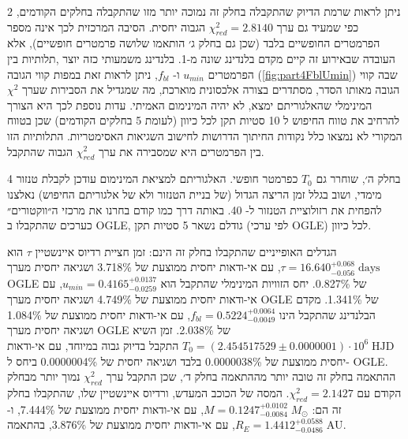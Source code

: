 \documentclass{article}
\begin{document}
\begin{multicols}{2}
\vspace{0.25cm}
\noindent
ניתן לראות שרמת הדיוק שהתקבלה בחלק זה נמוכה יותר מזו שהתקבלה בחלקים הקודמים,
כפי שמעיד גם ערך
\mbox{$\chi^2_{red}=2.8140$}
הגבוה יחסית.
הסיבה המרכזית לכך אינה מספר הפרמטרים החופשיים בלבד
(שכן גם בחלק ג׳ הותאמו שלושה פרמטרים חופשיים),
אלא העובדה שבאירוע זה קיים מקדם בלנדינג שונה מ-1.
בלנדינג משמעותי כזה יוצר ,תלותיות בין הפרמטרים
$u_{min}$
ו-
$f_{bl}$,
ניתן לראות זאת במפות קווי הגובה 
(\ref{fig:part4FblUmin})
שבה קווי הגובה מאותו הסדר, מסתדרים בצורה אלכסונית מוארכת, 
מה שמגדיל את הסבירות שערך 
$\chi^2$
המינימלי שהאלגוריתם ימצא, לא יהיה המינימום האמיתי.
עדות נוספת לכך היא הצורך להרחיב את טווח החיפוש ל
10
סטיות תקן לכל כיוון 
(לעומת 5 בחלקים הקודמים)
שכן בטווח המקורי לא נמצאו כלל נקודות החיתוך הדרושות לחישוב השגיאות האסימטריות.
התלותיות הזו בין הפרמטרים היא שמסבירה את ערך 
$\chi^2_{red}$
הגבוה שהתקבל.

בחלק ה׳,
שוחרר גם 
$T_0$
כפרמטר חופשי.
האלגוריתם למציאת המינימום עודכן לקבלת טנזור 4 מימדי,
ושוב בגלל זמן הריצה הגדול (של בניית הטנזור ולא של אלגוריתם החיפוש)
נאלצנו להפחית את רזולוציית הטנזור ל-
40.
באותה דרך כמו קודם בחרנו את מרכזי ה״ווקטורים״ כערכים שהתקבלו ב
\textenglish{OGLE},
גודלם נשאר 5 סטיות תקן (לפי ערכי 
\textenglish{OGLE})
לכל כיוון.

הגדלים האופייניים שהתקבלו בחלק זה הינם:
זמן חציית רדיוס איינשטיין
$\tau$
הוא
\mbox{$\tau = 16.640^{+0.068}_{-0.056}\;\text{days}$},
עם אי-ודאות יחסית ממוצעת של
\mbox{3.718\%}
ושגיאה יחסית מערך
\textenglish{OGLE}
של
\mbox{0.827\%}.
יחס הזוויות המינימלי שהתקבל הוא
\mbox{$u_{min} = 0.4165^{+0.0137}_{-0.0259}$},
עם אי-ודאות יחסית ממוצעת של
\mbox{4.749\%}
ושגיאה יחסית מערך
\textenglish{OGLE}
של
\mbox{1.341\%}.
מקדם הבלנדינג שהתקבל הינו
\mbox{$f_{bl} = 0.5224^{+0.0064}_{-0.0049}$},
עם אי-ודאות יחסית ממוצעת של
\mbox{1.084\%}
ושגיאה יחסית מערך
\textenglish{OGLE}
של
\mbox{2.038\%}.
זמן השיא
\mbox{$T_0 = (2.454517529\pm0.0000001)\cdot10^{6}\;\text{HJD}$}
התקבל בדיוק גבוה במיוחד, עם אי-ודאות יחסית ממוצעת של
\mbox{0.0000038\%}
בלבד ושגיאה יחסית של
\mbox{0.0000004\%}
ביחס ל-
\textenglish{OGLE}.
ההתאמה בחלק זה טובה יותר מההתאמה בחלק ד׳,
שכן התקבל ערך 
$\chi^2_{red}$
נמוך יותר מבחלק הקודם עם 
$\chi^2_{red}= 2.1427$.
המסה של הכוכב המעדש, ורדיוס איינשטיין שלו, שהתקבלו בחלק זה הם:
\mbox{$M = 0.1247^{+0.0102}_{-0.0084}\;M_{\odot}$},
עם אי-ודאות יחסית ממוצעת של
\mbox{7.444\%},
ו-
\mbox{$R_E = 1.4412^{+0.0588}_{-0.0486}\;\text{AU}$},
עם אי-ודאות יחסית ממוצעת של
\mbox{3.876\%},
בהתאמה.




\end{multicols}
\end{document}
